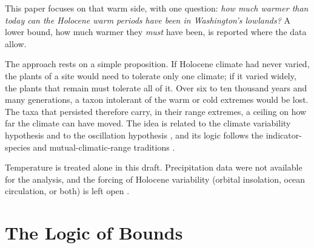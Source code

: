 \documentclass[11pt]{article}
\begin{document}
This paper focuses on that warm side, with one question: \emph{how much warmer than today can the Holocene warm periods have been in Washington's lowlands?} A lower bound, how much warmer they \emph{must} have been, is reported where the data allow.

The approach rests on a simple proposition. If Holocene climate had never varied, the plants of a site would need to tolerate only one climate; if it varied widely, the plants that remain must tolerate all of it. Over six to ten thousand years and many generations, a taxon intolerant of the warm or cold extremes would be lost. The taxa that persisted therefore carry, in their range extremes, a ceiling on how far the climate can have moved. The idea is related to the climate variability hypothesis \citep{janzen1967,stevens1989,ghalambor2006} and to the oscillation hypothesis \citep{dynesiusjansson2000}, and its logic follows the indicator-species and mutual-climatic-range traditions \citep{iversen1944,atkinson1987,thompson2012atlasF}.

Temperature is treated alone in this draft. Precipitation data were not available for the analysis, and the forcing of Holocene variability (orbital insolation, ocean circulation, or both) is left open \citep{bartlein1998,barron2003}.

\section{The Logic of Bounds}\label{sec:logic}
\end{document}
